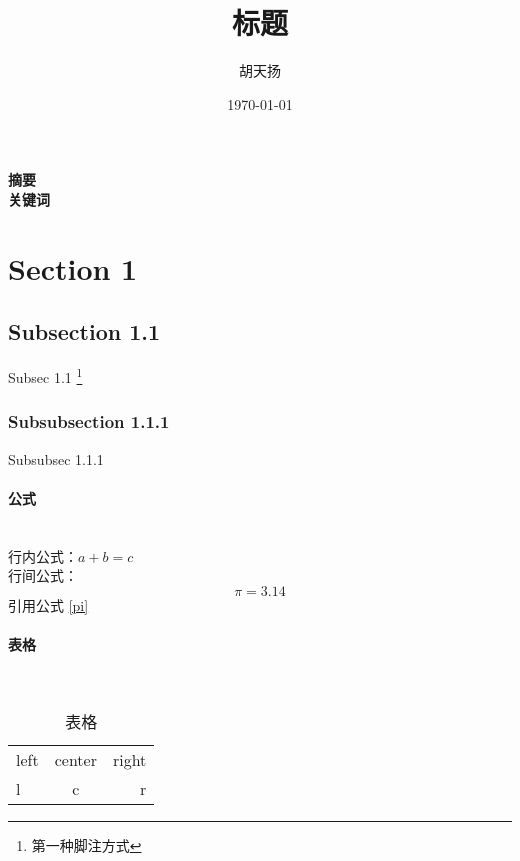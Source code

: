 \documentclass[UTF8, a4paper]{ctexart}
\begin{document}
\title{\huge{ 标题}}
\author{胡天扬}
\date{\today}
\maketitle  %


\begin{flushleft}   %
    \textbf{摘要} \\[8pt]
    \textbf{关键词}
\end{flushleft}


  
\begin{multicols}{2}
\end{multicols}

\section{Section 1} \label{sec1}
\subsection{Subsection 1.1}
Subsec 1.1  \footnote{第一种脚注方式}
\subsubsection{Subsubsection 1.1.1}
Subsubsec 1.1.1 \footnotemark
{}

\paragraph{公式}~{}\\
行内公式：$a+b=c$\\
行间公式：
\begin{equation}
    \label{pi}
    \pi=3.14 \tag{1} 
\end{equation}
引用公式 \eqref{pi}

\paragraph{表格}~{}
\begin{table}[!htbp]
    \caption{表格}
    \centering
    \begin{tabular}{|l|c|r|}    %
        \hline
        left & center & right \\
        l & c & r\\
        \hline
    \end{tabular}
\end{table}
\end{document}
